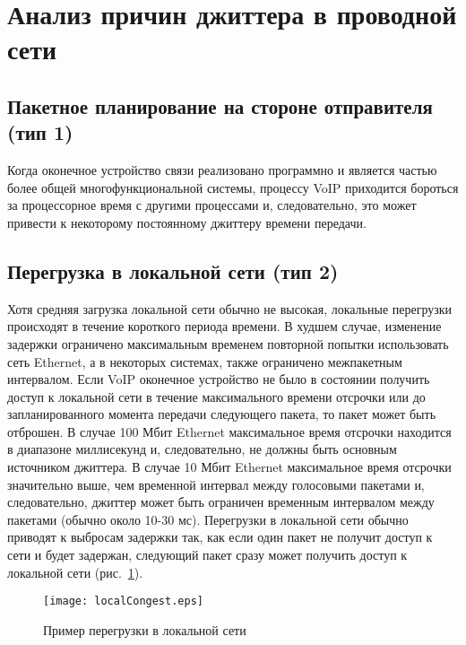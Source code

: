 \section{Анализ причин джиттера в проводной сети} \label{sect2_1}

\subsection{Пакетное планирование на стороне отправителя (тип 1)} \label{subsect2_1_1}
Когда оконечное устройство связи реализовано программно и является частью более общей многофункциональной системы, процессу VoIP приходится бороться за процессорное время с другими процессами и, следовательно, это может привести к некоторому постоянному джиттеру времени передачи.

\subsection{Перегрузка в локальной сети (тип 2)} \label{subsect2_1_2}
Хотя средняя загрузка локальной сети обычно не высокая, локальные перегрузки происходят в течение короткого периода времени. В худшем случае, изменение задержки ограничено максимальным временем повторной попытки использовать сеть Ethernet, а в некоторых системах, также ограничено межпакетным интервалом.
Если VoIP оконечное устройство не было в состоянии получить доступ к локальной сети в течение максимального времени отсрочки или до запланированного момента передачи следующего пакета, то пакет может быть отброшен. В случае 100 Мбит Ethernet максимальное время отсрочки находится в диапазоне миллисекунд и, следовательно, не должны быть основным источником джиттера. В случае 10 Мбит Ethernet максимальное время отсрочки значительно выше, чем временной интервал между голосовыми пакетами и, следовательно, джиттер может быть ограничен временным интервалом между пакетами (обычно около 10-30 мс).
Перегрузки в локальной сети обычно приводят к выбросам задержки так, как если один пакет не получит доступ к сети и будет задержан, следующий пакет сразу может получить доступ к локальной сети (рис. \ref{img:localCongest}).

\begin{figure} [h]
  \center
\texttt{[image: localCongest.eps]}
  \caption{Пример перегрузки в локальной сети \cite{clark}}
  \label{img:localCongest}
\end{figure}

